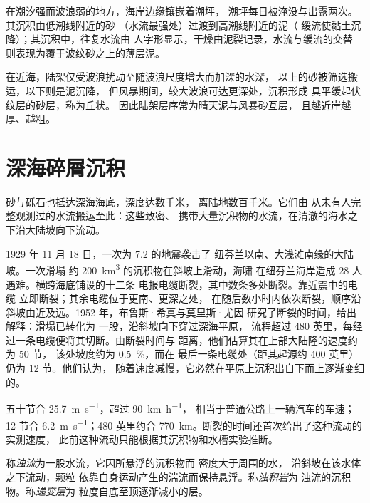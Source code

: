 在潮汐强而波浪弱的地方，海岸边缘镶嵌着潮坪，
潮坪每日被淹没与出露两次。其沉积由低潮线附近的砂
（水流最强处）过渡到高潮线附近的泥（
缓流使黏土沉降）；其沉积中，往复水流由
人字形显示，干燥由泥裂记录，水流与缓流的交替
则表现为覆于波纹砂之上的薄层泥。

在近海，陆架仅受波浪扰动至随波浪尺度增大而加深的水深，
以上的砂被筛选搬运，以下则是泥沉降，
但风暴期间，较大波浪可达更深处，沉积形成
具平缓起伏纹层的砂层，称为丘状。
因此陆架层序常为晴天泥与风暴砂互层，
且越近岸越厚、越粗。

\section{深海碎屑沉积}\label{sec:b1:clastic-sediments:deep-sea}

砂与砾石也抵达深海海底，深度达数千米，
离陆地数百千米。它们由
从未有人完整观测过的水流搬运至此：这些致密、
携带大量沉积物的水流，在清澈的海水之下沿大陆坡向下流动。

\begin{history}[海底电缆，1929 年]
1929 年 11 月 18 日，一次为 7.2 的地震袭击了
纽芬兰以南、大浅滩南缘的大陆坡。一次滑塌
约 \qty{200}{km^3} 的沉积物在斜坡上滑动，海啸
在纽芬兰海岸造成 28 人遇难。横跨海底铺设的十二条
电报电缆断裂，其中数条多处断裂。靠近震中的电缆
立即断裂；其余电缆位于更南、更深之处，
在随后数小时内依次断裂，顺序沿斜坡由近及远。1952 年，布鲁斯·希真与莫里斯·尤因
研究了断裂的时间，给出解释：滑塌已转化为
一股，沿斜坡向下穿过深海平原，
流程超过 480 英里，每经过一条电缆便将其切断。由断裂时间与
距离，他们估算其在上部大陆隆的速度约为 50 节，
该处坡度约为 \qty{0.5}{\percent}，而在
最后一条电缆处（距其起源约 400 英里）仍为 12 节。他们认为，
随着速度减慢，它必然在平原上沉积出自下而上逐渐变细的。
\end{history}

五十节合 \qty{25.7}{m.s^{-1}}，超过 \qty{90}{km.h^{-1}}，
相当于普通公路上一辆汽车的车速；12 节合 \qty{6.2}{m.s^{-1}}；480 英里约合
\qty{770}{km}。断裂的时间还首次给出了这种流动的实测速度，
此前这种流动只能根据其沉积物和水槽实验推断。

\begin{definition}\label{def:b1:clastic-sediments:turbidite}
称\emph{浊流}为一股水流，它因所悬浮的沉积物而
密度大于周围的水，
沿斜坡在该水体之下流动，颗粒
依靠自身运动产生的湍流而保持悬浮。称\emph{浊积岩}为
浊流的沉积物。称\emph{递变层}为
粒度自底至顶逐渐减小的层。
\end{definition}

